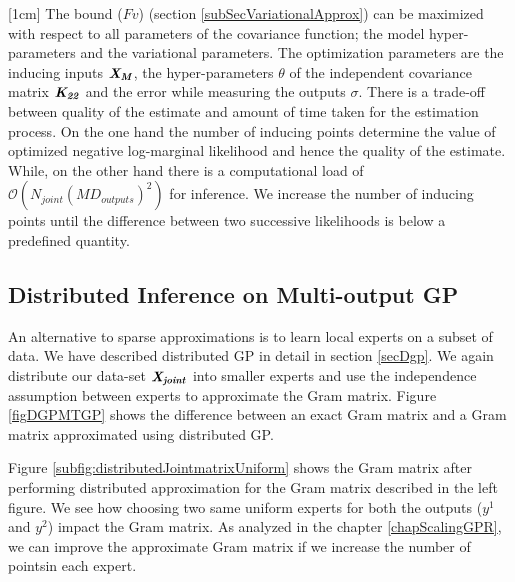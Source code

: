 [1cm]
The bound ($Fv$) (section \ref{subSecVariationalApprox}) can be maximized with respect to all parameters of the covariance function; the model hyper-parameters and the variational parameters. The optimization parameters are the inducing inputs \(\bm{\mathit{X_{M}}}\), the hyper-parameters \(\theta\) of the independent covariance matrix \(\bm{\mathit{K_{22}}}\) and the error while measuring the outputs \(\sigma\). There is a trade-off between quality of the estimate and amount of time taken for the estimation process. On the one hand the number of inducing points determine the value of optimized negative log-marginal likelihood and hence the quality of the estimate. While, on the other hand there is a computational load of \(\mathcal{O}\left ( N_{joint}(MD_{outputs})^{2} \right )\) for inference. We increase the number of inducing points until the difference between two successive likelihoods is below a predefined quantity.   

\subsection{Distributed Inference on Multi-output GP}\label{sec:dMOGP}
An alternative to sparse approximations is to learn local experts on a subset of data. We have described distributed GP in detail in section \ref{secDgp}. We again distribute our data-set $\bm{\mathit{X_{joint}}}$ into smaller experts and use the independence assumption between experts to approximate the Gram matrix.  Figure \ref{figDGPMTGP} shows the difference between an exact Gram matrix and a Gram matrix approximated using distributed GP.

Figure \ref{subfig:distributedJointmatrixUniform} shows the Gram matrix after performing distributed approximation for the Gram matrix described in the left figure. We see how choosing two same uniform experts for both the outputs ($y^1$ and $y^2$) impact the Gram matrix. As analyzed in the chapter \ref{chapScalingGPR}, we can improve the approximate Gram matrix if we increase the number of pointsin each expert. 

